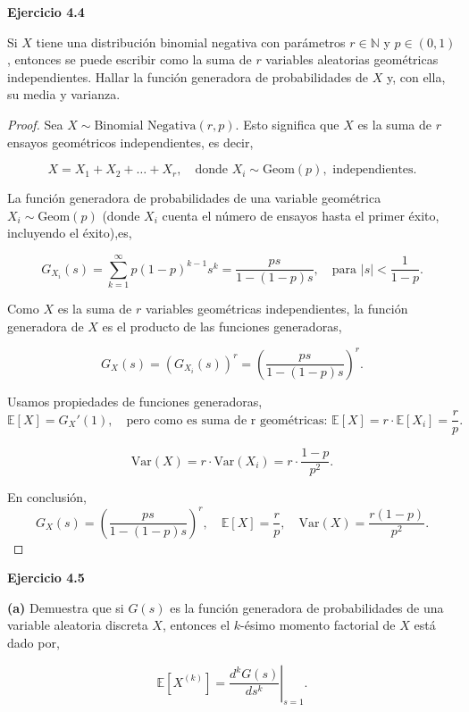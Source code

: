 \documentclass{article}
\begin{document}

\textbf{Ejercicio 4.4}

Si $X$ tiene una distribución binomial negativa con parámetros $r \in \mathbb{N}$ y $p \in (0,1)$, entonces se puede escribir como la suma de $r$ variables aleatorias geométricas independientes. Hallar la función generadora de probabilidades de $X$ y, con ella, su media y varianza.

\begin{proof}
Sea $X \sim \text{Binomial Negativa}(r, p)$. Esto significa que $X$ es la suma de $r$ ensayos geométricos independientes, es decir,

\[
X = X_1 + X_2 + \dots + X_r, \quad \text{donde } X_i \sim \text{Geom}(p), \text{ independientes}.
\]

La función generadora de probabilidades de una variable geométrica $X_i \sim \text{Geom}(p)$ (donde $X_i$ cuenta el número de ensayos hasta el primer éxito, incluyendo el éxito),es,

\[
G_{X_i}(s) = \sum_{k=1}^{\infty} p (1-p)^{k-1} s^k = \frac{ps}{1 - (1-p)s}, \quad \text{para } |s| < \frac{1}{1-p}.
\]

Como $X$ es la suma de $r$ variables geométricas independientes, la función generadora de $X$ es el producto de las funciones generadoras,

\[
G_X(s) = \left( G_{X_i}(s) \right)^r = \left( \frac{ps}{1 - (1-p)s} \right)^r.
\]

Usamos propiedades de funciones generadoras,
\[
\mathbb{E}[X] = G_X'(1), \quad \text{pero como es suma de r geométricas: } \mathbb{E}[X] = r \cdot \mathbb{E}[X_i] = \frac{r}{p}.
\]

\[
\text{Var}(X) = r \cdot \text{Var}(X_i) = r \cdot \frac{1 - p}{p^2}.
\]

En conclusión,
\[
G_X(s) = \left( \frac{ps}{1 - (1-p)s} \right)^r, \quad \mathbb{E}[X] = \frac{r}{p}, \quad \text{Var}(X) = \frac{r(1 - p)}{p^2}.
\]
\end{proof}

\textbf{Ejercicio 4.5}

\textbf{(a)} Demuestra que si $G(s)$ es la función generadora de probabilidades de una variable aleatoria discreta $X$, entonces el $k$-ésimo momento factorial de $X$ está dado por,

\[
\mathbb{E}[X^{(k)}] = \left. \frac{d^k G(s)}{ds^k} \right|_{s=1}.
\]
\end{document}
